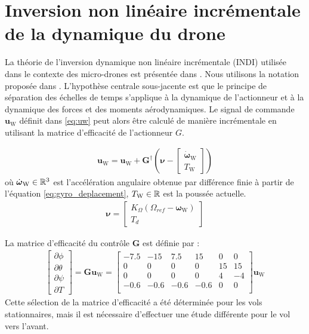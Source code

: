 \section{Inversion non linéaire incrémentale de la dynamique du drone}

La théorie de l'inversion dynamique non linéaire incrémentale (INDI) utilisée dans le contexte des micro-drones est présentée dans \cite{smeurINDI}. Nous utilisons la notation proposée dans \cite{smeurINDITail}. L'hypothèse centrale sous-jacente est que le principe de séparation des échelles de temps s'applique à la dynamique de l'actionneur et à la dynamique des forces et des moments aérodynamiques. Le signal de commande $\boldsymbol{u}_{\text{W}}$ définit dans \eqref{eq:uw} peut alors être calculé de manière incrémentale en utilisant la matrice d'efficacité de l'actionneur $G$.

\begin{align}
    \boldsymbol{u}_{\text{W}} = \boldsymbol{u}_{\text{W}} + \boldsymbol{G}^{\dag} (\boldsymbol{\nu} - \begin{bmatrix}
    \dot{\boldsymbol{\omega}}_{\text{W}} \\
    T_{\text{W}}
    \end{bmatrix})
\end{align}
où  $ \dot{\boldsymbol{\omega}}_{\text{W}} \in {\mathbb R}^{3}$ est l'accélération angulaire obtenue par différence finie à partir de l'équation \eqref{eq:gyro_deplacement},  $T_{\text{W}} \in {\mathbb R}$ est la poussée actuelle.
\begin{align}
    \boldsymbol{\nu} = \begin{bmatrix}
        K_{\Omega} (\Omega_{ref}-\boldsymbol{\omega}_{\text{W}})\\
        T_{d}
    \end{bmatrix}
\end{align}


La matrice d'efficacité du contrôle $\boldsymbol{G}$ est définie par :
\begin{align*}
    \begin{bmatrix}
    \partial \phi \\
    \partial \theta \\
    \partial \psi \\
    \partial T
    \end{bmatrix}\! =\! \boldsymbol{G} \boldsymbol{u}_{\text{W}} \!=\!
    \begin{bmatrix}
    -7.5 & -15 & 7.5 & 15 & 0 & 0\\
    0 & 0 & 0 & 0 & 15 & 15 \\
    0 & 0 & 0 & 0 & 4 & -4 \\
    -0.6 & -0.6 & -0.6 & -0.6 & 0 & 0\\
    \end{bmatrix}
    \boldsymbol{u}_{\text{W}}
\end{align*}
Cette sélection de la matrice d'efficacité a été déterminée pour les vols stationnaires, mais il est nécessaire d'effectuer une étude différente pour le vol vers l'avant.

